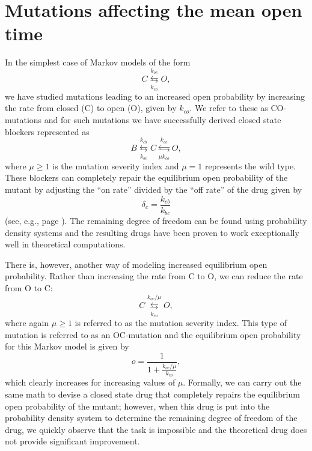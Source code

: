 
\chapter{Mutations affecting the mean open time}
\label{mot_chapter}

In the simplest case of Markov models of the form
\begin{equation}
C\underset{k_{co}}{\overset{k_{oc}}{\leftrightarrows}}O, \label{mot_markov}
\end{equation}
we have studied mutations leading to an increased open probability by increasing
the rate from closed (C) to open (O), given by $k_{co}$. We refer to these as 
CO-mutations and for such mutations we
have successfully derived closed state blockers represented as
\begin{equation}
B\underset{k_{bc}}{\overset{k_{cb}}{\leftrightarrows}}C\underset{\mu
k_{co}}{\overset{k_{oc}}{\leftrightarrows}}O, \label{mot_cl}
\end{equation}
where $\mu\geqslant1$ is the mutation severity index and $\mu=1$
represents the wild type. These blockers can completely repair the equilibrium
open probability of the mutant by adjusting the ``on rate'' divided by the
``off rate'' of the drug given by
\[
\delta_{c}=\frac{k_{cb}}{k_{bc}}
\]
(see, e.g., page \pageref{d_c}). The remaining degree of freedom can be found
using probability density systems and the resulting drugs have been proven to
work exceptionally well in theoretical computations.

There is, however, another way of modeling increased equilibrium open
probability. Rather than increasing the rate from C to O, we can reduce the
rate from O to C:
\begin{equation}
C\underset{k_{co}}{\overset{k_{oc}/\mu}{\leftrightarrows}}O,
\end{equation}
where again $\mu\geqslant1$ is referred to as the mutation severity index. 
This type of mutation is referred to as an OC-mutation and the
equilibrium open probability for this Markov model is given by
\[
o=\frac{1}{1+\frac{k_{oc}/\mu}{k_{co}}},
\]
which clearly increases for increasing values of $\mu.$ Formally, we can carry out
the same math to devise a closed state drug that completely repairs the
equilibrium open probability of the mutant; however, when this drug is put into the
probability density system to determine the remaining degree of
freedom of the drug, we quickly observe that the task is impossible and the
theoretical drug does not provide significant improvement.

